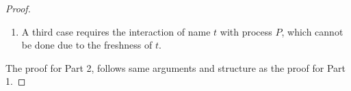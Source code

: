 \begin{proof}
\begin{enumerate}
\begin{enumerate}
							We need to show that
							\[
								\horel{\Gamma}{\Delta_1'}{\newsp{\widetilde{m_1}}{P \Par \htrigger{t'}{s}  } }
								{\hwb}
								{\Delta_2'}{\newsp{\widetilde{m_2}}{Q \Par \htrigger{t'}{s}  } }
							\]
							The proof is easy if we consider that both processes can observe the
							up to deterministic transitions $\hby{\bactinp{t'}{\abs{z}{\inact}}} \Hby{\dtau}$.
							\begin{eqnarray*}
								&&\Gamma; \es; \Delta_1' \proves \newsp{\widetilde{m_1}}{P \Par \htrigger{t'}{s}  } \\
								\hby{\bactinp{t'}{\abs{z}{\inact}}} &&
								\Delta_1' \proves \newsp{\widetilde{m_1}}{P \Par \newsp{s'}{\binp{s'}{y} (\appl{(\abs{z}{\inact})}{y}) \Par \bout{\dual{s'}}{s} \inact}}
								\\
								\hby{\dtau} &&
								\Delta_1' \proves \news{\widetilde{m_1}}{P}
							\end{eqnarray*}
							and
							\begin{eqnarray*}
								&&\Gamma; \es; \Delta_2' \proves \newsp{\widetilde{m_2}}{Q \Par \htrigger{t'}{s}  } \\
								\hby{\bactinp{t'}{\abs{z}{\inact}}} &&
								\Delta_2' \proves \newsp{\widetilde{m_2}}{Q \Par \newsp{s'}{\binp{s'}{y} (\appl{(\abs{z}{\inact})}{y}) \Par \bout{\dual{s'}}{s} \inact}}
								\\
								\hby{\dtau} &&
								\Delta_2' \proves \news{\widetilde{m_2}}{Q}
							\end{eqnarray*}
							The result is then immediate from the definition of $Re$ that
							requires
							\[
								\horel{\Gamma}{\Delta_3}{\news{\widetilde{m_1}}{P  } }
								{\hwb}
								{\Delta_4}{\news{\widetilde{m_2}}{Q  } }
							\]
					\item	A third case requires the interaction of name $t$ with process $P$,
							which cannot be done due to the freshness of $t$.
				\end{enumerate}
	\end{enumerate}
	
	The proof for Part 2, follows same arguments and structure as
	the proof for Part 1.


\end{proof}
